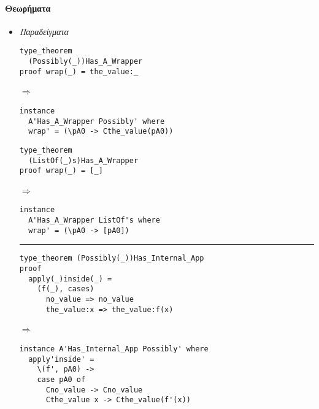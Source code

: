 \documentclass[diploma]{softlab-thesis}
\def\lra{$\Longrightarrow$\ }
\begin{document}
\newpage

\paragraph{Θεωρήματα}

\begin{itemize}

\item
\textit{Παραδείγματα}\\

\begin{minipage}{0.45\linewidth}

\begin{verbatim}
type_theorem
  (Possibly(_))Has_A_Wrapper
proof wrap(_) = the_value:_
\end{verbatim}

\lra

\begin{verbatim}
instance
  A'Has_A_Wrapper Possibly' where
  wrap' = (\pA0 -> Cthe_value(pA0))

\end{verbatim}

\end{minipage}
\hfill\vline\hfill
\begin{minipage}{0.50\linewidth}

\begin{verbatim}
type_theorem
  (ListOf(_)s)Has_A_Wrapper
proof wrap(_) = [_]
\end{verbatim}

\lra

\begin{verbatim}
instance
  A'Has_A_Wrapper ListOf's where
  wrap' = (\pA0 -> [pA0])

\end{verbatim}

\end{minipage}

\rule{\linewidth}{0.1pt}

\begin{verbatim}
type_theorem (Possibly(_))Has_Internal_App
proof
  apply(_)inside(_) =
    (f(_), cases)
      no_value => no_value
      the_value:x => the_value:f(x)
\end{verbatim}

\lra

\begin{verbatim}
instance A'Has_Internal_App Possibly' where
  apply'inside' =
    \(f', pA0) ->
    case pA0 of
      Cno_value -> Cno_value
      Cthe_value x -> Cthe_value(f'(x))
\end{verbatim}



\end{itemize}
\end{document}
